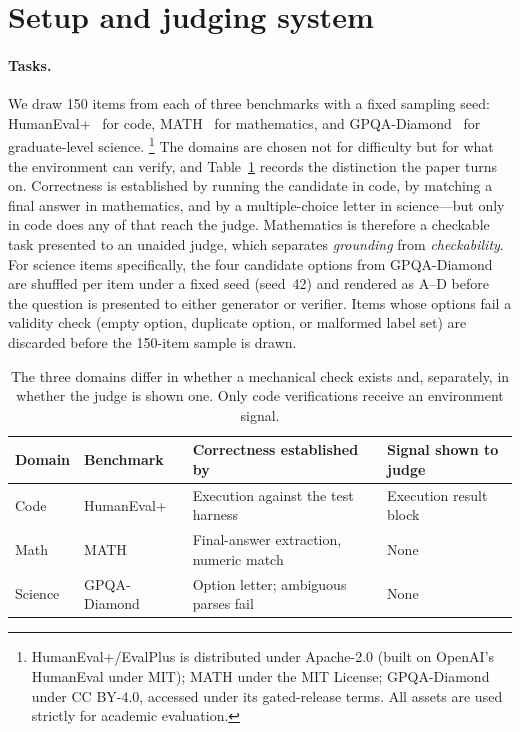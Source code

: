 \documentclass{article}
\begin{document}
\section{Setup and judging system}
\label{sec:setup}

\paragraph{Tasks.} We draw 150 items from each of three benchmarks with a fixed sampling
seed: HumanEval+~\citep{liu2023evalplus} for code, MATH~\citep{hendrycks2021math} for
mathematics, and GPQA-Diamond~\citep{rein2024gpqa} for graduate-level science.
\footnote{HumanEval+/EvalPlus is distributed under Apache-2.0 (built on OpenAI's
HumanEval under MIT); MATH under the MIT License; GPQA-Diamond under CC BY-4.0, accessed
under its gated-release terms. All assets are used strictly for academic evaluation.} The domains
are chosen not for difficulty but for what the environment can verify, and Table~\ref{tab:domains}
records the distinction the paper turns on. Correctness is established by running the
candidate in code, by matching a final answer in mathematics, and by a multiple-choice
letter in science---but only in code does any of that reach the judge. Mathematics is
therefore a checkable task presented to an unaided judge, which separates
\emph{grounding} from \emph{checkability}. For science items specifically, the four candidate options from GPQA-Diamond are
shuffled per item under a fixed seed (seed~42) and rendered as A--D before the
question is presented to either generator or verifier. Items whose options fail
a validity check (empty option, duplicate option, or malformed label set) are
discarded before the 150-item sample is drawn.

\begin{table}[H]
  \caption{The three domains differ in whether a mechanical check exists and, separately,
  in whether the judge is shown one. Only code verifications receive an environment signal.}
  \label{tab:domains}
  \centering
  \small
  \begin{tabular}{llll}
    \toprule
    Domain & Benchmark & Correctness established by & Signal shown to judge \\
    \midrule
    Code    & HumanEval+     & Execution against the test harness      & Execution result block \\
    Math    & MATH           & Final-answer extraction, numeric match  & None \\
    Science & GPQA-Diamond   & Option letter; ambiguous parses fail    & None \\
    \bottomrule
  \end{tabular}
\end{table}
\end{document}
